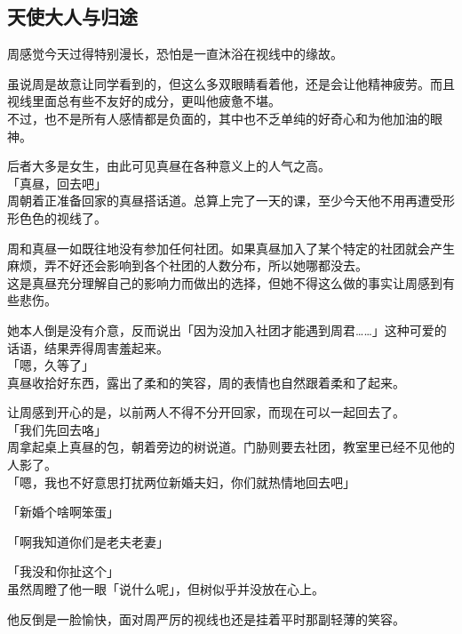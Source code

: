 \subsection{天使大人与归途}

周感觉今天过得特别漫长，恐怕是一直沐浴在视线中的缘故。

虽说周是故意让同学看到的，但这么多双眼睛看着他，还是会让他精神疲劳。而且视线里面总有些不友好的成分，更叫他疲惫不堪。\\

不过，也不是所有人感情都是负面的，其中也不乏单纯的好奇心和为他加油的眼神。

后者大多是女生，由此可见真昼在各种意义上的人气之高。\\

「真昼，回去吧」\\

周朝着正准备回家的真昼搭话道。总算上完了一天的课，至少今天他不用再遭受形形色色的视线了。

周和真昼一如既往地没有参加任何社团。如果真昼加入了某个特定的社团就会产生麻烦，弄不好还会影响到各个社团的人数分布，所以她哪都没去。\\

这是真昼充分理解自己的影响力而做出的选择，但她不得这么做的事实让周感到有些悲伤。

她本人倒是没有介意，反而说出「因为没加入社团才能遇到周君……」这种可爱的话语，结果弄得周害羞起来。\\

「嗯，久等了」\\

真昼收拾好东西，露出了柔和的笑容，周的表情也自然跟着柔和了起来。

让周感到开心的是，以前两人不得不分开回家，而现在可以一起回去了。\\

「我们先回去咯」\\

周拿起桌上真昼的包，朝着旁边的树说道。门胁则要去社团，教室里已经不见他的人影了。\\

「嗯，我也不好意思打扰两位新婚夫妇，你们就热情地回去吧」

「新婚个啥啊笨蛋」

「啊我知道你们是老夫老妻」

「我没和你扯这个」\\

虽然周瞪了他一眼「说什么呢」，但树似乎并没放在心上。

他反倒是一脸愉快，面对周严厉的视线也还是挂着平时那副轻薄的笑容。\\

